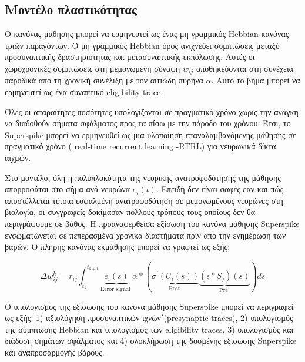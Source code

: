 \documentclass[12pt]{report}
\begin{document}
\subsection{Μοντέλο πλαστικότητας}

Ο κανόνας μάθησης μπορεί να ερμηνευτεί ως ένας μη γραμμικός \textlatin{ Hebbian} κανόνας τριών παραγόντων. Ο μη γραμμικός \textlatin{ Hebbian} όρος ανιχνεύει συμπτώσεις μεταξύ προσυναπτικής δραστηριότητας και μετασυναπτικής εκπόλωσης. Αυτές οι χωροχρονικές συμπτώσεις στη μεμονωμένη σύναψη  $w_{i j}$ αποθηκεύονται στη συνέχεια παροδικά από τη χρονική συνέλιξη με τον αιτιώδη πυρήνα $\alpha$. Αυτό το βήμα μπορεί να ερμηνευτεί ως ένα συναπτικό \textlatin{eligibility trace}.

Όλες οι απαραίτητες ποσότητες υπολογίζονται σε πραγματικό χρόνο χωρίς την ανάγκη να διαδοθούν σήματα σφάλματος προς τα πίσω με την πάροδο του χρόνου. Έτσι, το \textlatin{Superspike} μπορεί να ερμηνευθεί ως μια υλοποίηση επαναλαμβανόμενης μάθησης σε πραγματικό χρόνο (\textlatin{ real-time recurrent learning }-\textlatin{RTRL}) \cite{williams1989} για νευρωνικά δίκτα αιχμών.

Στο μοντέλο, όλη η πολυπλοκότητα της νευρικής ανατροφοδότησης της μάθησης απορροφάται στο σήμα ανά νευρώνα $e_{i}(t) .$  Επειδή δεν είναι σαφές εάν και πώς αποστέλλεται τέτοια εσφαλμένη ανατροφοδότηση σε μεμονωμένους νευρώνες στη βιολογία, οι συγγραφείς δοκίμασαν πολλούς τρόπους τους οποίους δεν θα περιγράψουμε σε βάθος. Η προαναφερθείσα εξίσωση του κανόνα μάθησης \textlatin{Superspike} ενσωματώνεται σε πεπερασμένα χρονικά διαστήματα πριν από την ενημέρωση των βαρών. Ο πλήρης κανόνας εκμάθησης μπορεί να γραφτεί ως εξής:

\begin{equation}
\label{eqn:integratedsuperspike}
\Delta w_{i j}^{k}=r_{i j} \int_{t_{k}}^{t_{k+1}} \underbrace{e_{i}(s)}_{\text {Error signal }} \alpha *(\underbrace{\sigma^{\prime}\left(U_{i}(s)\right)}_{\text {Post }} \underbrace{\left(\epsilon * S_{j}\right)(s)}_{\text {Pre }}) d s
\end{equation}
 
O υπολογισμός της εξίσωσης του κανόνα μάθησης \textlatin{Superspike} μπορεί να περιγραφεί ως εξής: 1) αξιολόγηση προσυναπτικών ιχνών΄(\textlatin{presynaptic traces}), 2) υπολογισμός της σύμπτωσης \textlatin{Hebbian} και υπολογισμός των \textlatin{eligibility traces}, 3) υπολογισμός και διάδοση σημάτων σφάλματος και 4) ολοκλήρωση της δοσμένης εξίσωσης \textlatin{Superspike} και αναπροσαρμογής βάρους.
\end{document}
